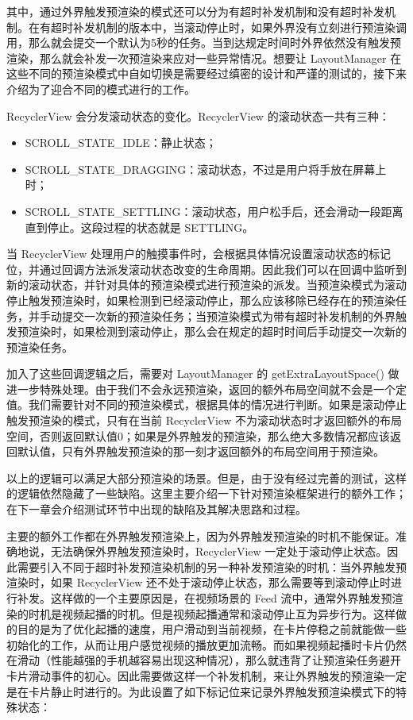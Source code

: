 其中，通过外界触发预渲染的模式还可以分为有超时补发机制和没有超时补发机制。在有超时补发机制的版本中，当滚动停止时，如果外界没有立刻进行预渲染调用，那么就会提交一个默认为5秒的任务。当到达规定时间时外界依然没有触发预渲染，那么就会补发一次预渲染来应对一些异常情况。想要让 LayoutManager 在这些不同的预渲染模式中自如切换是需要经过缜密的设计和严谨的测试的，接下来介绍为了迎合不同的模式进行的工作。

RecyclerView 会分发滚动状态的变化。RecyclerView 的滚动状态一共有三种：

\begin{itemize}
    \item SCROLL\_STATE\_IDLE：静止状态；
    \item SCROLL\_STATE\_DRAGGING：滚动状态，不过是用户将手放在屏幕上时；
    \item SCROLL\_STATE\_SETTLING：滚动状态，用户松手后，还会滑动一段距离直到停止。这段过程的状态就是 SETTLING。
\end{itemize}

当 RecyclerView 处理用户的触摸事件时，会根据具体情况设置滚动状态的标记位，并通过回调方法派发滚动状态改变的生命周期。因此我们可以在回调中监听到新的滚动状态，并针对具体的预渲染模式进行预渲染的派发。当预渲染模式为滚动停止触发预渲染时，如果检测到已经滚动停止，那么应该移除已经存在的预渲染任务，并手动提交一次新的预渲染任务；当预渲染模式为带有超时补发机制的外界触发预渲染时，如果检测到滚动停止，那么会在规定的超时时间后手动提交一次新的预渲染任务。

加入了这些回调逻辑之后，需要对 LayoutManager 的 getExtraLayoutSpace() 做进一步特殊处理。由于我们不会永远预渲染，返回的额外布局空间就不会是一个定值。我们需要针对不同的预渲染模式，根据具体的情况进行判断。如果是滚动停止触发预渲染的模式，只有在当前 RecyclerView 不为滚动状态时才返回额外的布局空间，否则返回默认值0；如果是外界触发的预渲染，那么绝大多数情况都应该返回默认值，只有外界触发预渲染的那一刻才返回额外的布局空间用于预渲染。

以上的逻辑可以满足大部分预渲染的场景。但是，由于没有经过完善的测试，这样的逻辑依然隐藏了一些缺陷。这里主要介绍一下针对预渲染框架进行的额外工作；在下一章会介绍测试环节中出现的缺陷及其解决思路和过程。

主要的额外工作都在外界触发预渲染上，因为外界触发预渲染的时机不能保证。准确地说，无法确保外界触发预渲染时，RecyclerView 一定处于滚动停止状态。因此需要引入不同于超时补发预渲染机制的另一种补发预渲染的时机：当外界触发预渲染时，如果 RecyclerView 还不处于滚动停止状态，那么需要等到滚动停止时进行补发。这样做的一个主要原因是，在视频场景的 Feed 流中，通常外界触发预渲染的时机是视频起播的时机。但是视频起播通常和滚动停止互为异步行为。这样做的目的是为了优化起播的速度，用户滑动到当前视频，在卡片停稳之前就能做一些初始化的工作，从而让用户感觉视频的播放更加流畅。而如果视频起播时卡片仍然在滑动（性能越强的手机越容易出现这种情况），那么就违背了让预渲染任务避开卡片滑动事件的初心。因此需要做这样一个补发机制，来让外界触发的预渲染一定是在卡片静止时进行的。为此设置了如下标记位来记录外界触发预渲染模式下的特殊状态：

